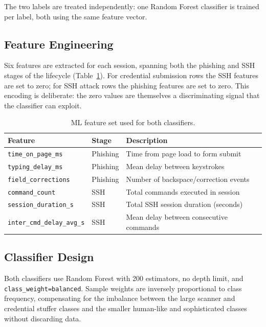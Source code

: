 The two labels are treated independently: one Random Forest classifier is
trained per label, both using the same feature vector.

\subsection{Feature Engineering}

Six features are extracted for each session, spanning both the phishing and SSH
stages of the lifecycle (Table~\ref{tab:features}). For credential submission
rows the SSH features are set to zero; for SSH attack rows the phishing features
are set to zero. This encoding is deliberate: the zero values are themselves a
discriminating signal that the classifier can exploit.

\begin{table}[h]
\centering
\caption{ML feature set used for both classifiers.}
\label{tab:features}
\begin{tabular}{lll}
\hline
\textbf{Feature} & \textbf{Stage} & \textbf{Description} \\
\hline
\texttt{time\_on\_page\_ms}        & Phishing & Time from page load to form submit \\
\texttt{typing\_delay\_ms}         & Phishing & Mean delay between keystrokes \\
\texttt{field\_corrections}        & Phishing & Number of backspace/correction events \\
\texttt{command\_count}            & SSH      & Total commands executed in session \\
\texttt{session\_duration\_s}      & SSH      & Total SSH session duration (seconds) \\
\texttt{inter\_cmd\_delay\_avg\_s} & SSH      & Mean delay between consecutive commands \\
\hline
\end{tabular}
\end{table}

\subsection{Classifier Design}

Both classifiers use Random Forest \cite{Bringer2012HoneypotSurvey} with 200
estimators, no depth limit, and \texttt{class\_weight=balanced}. Sample weights
are inversely proportional to class frequency, compensating for the imbalance
between the large scanner and credential stuffer classes and the smaller
human-like and sophisticated classes without discarding data.

